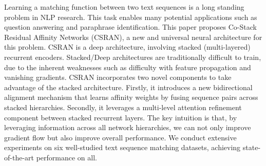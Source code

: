 Learning a matching function between two text sequences is a long standing problem in NLP research. This task enables many potential applications such as question answering and paraphrase identification. This paper proposes Co-Stack Residual Affinity Networks (CSRAN), a new and universal neural architecture for this problem. CSRAN is a deep architecture, involving stacked (multi-layered) recurrent encoders. Stacked/Deep architectures are traditionally difficult to train, due to the inherent weaknesses such as difficulty with feature propagation and vanishing gradients. CSRAN incorporates two novel components to take advantage of the stacked architecture. Firstly, it introduces a new bidirectional alignment mechanism that learns affinity weights by fusing sequence pairs across stacked hierarchies. Secondly, it leverages a multi-level attention refinement component between stacked recurrent layers. The key intuition is that, by leveraging information across all network hierarchies, we can not only improve gradient flow but also improve overall performance. We conduct extensive experiments on six well-studied text sequence matching datasets, achieving state-of-the-art performance on all.

